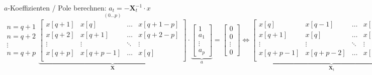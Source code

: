 	\renewcommand{\arraystretch}{1.0}
	\begin{aufzaehlung}
  		\item $a$-Koeffizienten / Pole berechnen: $a_t = - \bm X_t^{-1} \cdot x$  \small $$
		\begin{matrix} n=q+1\\ n=q+2\\ \vdots \\ n=q+p \end{matrix}
		\overset{(0 \hdots p)}{\underbrace{\begin{bmatrix}
    		x[q+1] & x[q] & \hdots & x[q+1-p] \\                                   
    		x[q+2] & x[q+1] & \hdots & x[q+2-p] \\
    		\vdots & \vdots & \ddots & \vdots \\                             
    		x[q+p] & x[q+p-1] & \hdots & x[q] \\
		\end{bmatrix}  }_{\bm X}} \cdot \underbrace{\begin{bmatrix}
    		1 \\
    		a_1 \\
    		\vdots \\
    		a_p
		\end{bmatrix}  }_{a} = \begin{bmatrix}
    		0 \\
    		0 \\
    		\vdots \\
    		0
		\end{bmatrix} \Longleftrightarrow 
		\underbrace{ \begin{bmatrix}
    		x[q]     & x[q-1]   & \hdots & x[q-p+1] \\                                   
    		x[q+1]   & x[q]     & \hdots & x[q-p+2] \\
    		\vdots   & \vdots   & \ddots & \vdots \\                             
    		x[q+p-1] & x[q+p-2] & \hdots & x[q] \\
		\end{bmatrix}  
		}_{\bm  X_t} \cdot 
		\underbrace{\begin{bmatrix}
    		a_1 \\
    		a_2 \\
    		\vdots \\
    		a_p
		\end{bmatrix}  }_{a_t} = \underbrace{\begin{bmatrix}
    		-x [q+1]\\            
    		-x [q+2]\\
    		\vdots \\
    		-x [q+p]\\
		\end{bmatrix}}_{x} $$  \normalsize
		

\end{aufzaehlung}
